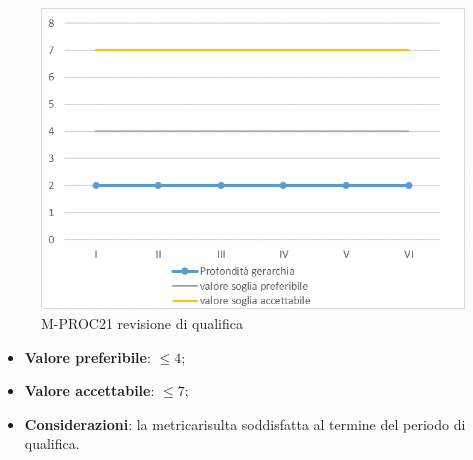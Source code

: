 \begin{figure}[H] 	
	\includegraphics[width=\linewidth]{./img/grafici/RQ21.png}	
	\caption{M-PROC21 revisione di qualifica}	
\end{figure}
\begin{itemize}
	\item \textbf{Valore preferibile}: $\le 4$;
	\item \textbf{Valore accettabile}: $\le 7$;
	\item \textbf{Considerazioni}: la metrica\glosp risulta soddisfatta al termine del periodo di qualifica.
\end{itemize}

